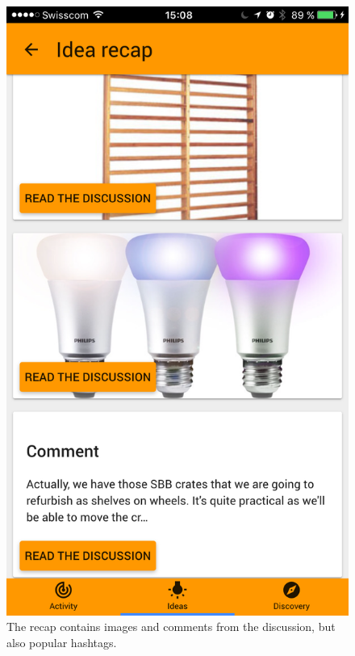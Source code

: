 \documentclass[a4paper,12pt,twoside]{article}
\begin{document}
\begin{figure}[!htb]
\begin{minipage}[t]{.48\textwidth}
        \includegraphics[width=.67\textwidth]{images/flow_recap_2.png}
        \caption{The recap contains images and comments from the discussion, but also popular hashtags.}
    \end{minipage}
\end{figure}
\end{document}

